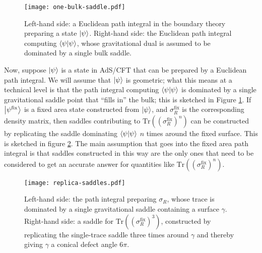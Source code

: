 \documentclass[a4paper,11pt]{article}
\renewcommand{\tr}{\text{Tr}}
\begin{document}
\begin{figure}
    \centering
    \texttt{[image: one-bulk-saddle.pdf]}
    \caption{Left-hand side: a Euclidean path integral in the boundary theory preparing a state $\ket{\psi}$. Right-hand side: the Euclidean path integral computing $\braket{\psi}{\psi}$, whose gravitational dual is assumed to be dominated by a single bulk saddle.}
    \label{fig:one-bulk-saddle}
\end{figure}

Now, suppose $\ket{\psi}$ is a state in AdS/CFT that can be prepared by a Euclidean path integral. We will assume that $\ket{\psi}$ is geometric; what this means at a technical level is that the path integral computing $\braket{\psi}{\psi}$ is dominated by a single gravitational saddle point that ``fills in'' the bulk; this is sketched in Figure \ref{fig:one-bulk-saddle}. If $\ket{\psi^{\text{fix}}}$ is a fixed area state constructed from $\ket{\psi}$, and $\sigma^{\text{fix}}_R$ is the corresponding density matrix, then saddles contributing to $\tr((\sigma^{\text{fix}}_R)^n)$ can be constructed by replicating the saddle dominating $\braket{\psi}{\psi}$ $n$ times around the fixed surface. This is sketched in figure \ref{fig:replica-saddles}. The main assumption that goes into the fixed area path integral is that saddles constructed in this way are the only ones that need to be considered to get an accurate answer for quantities like $\tr((\sigma^{\text{fix}}_R)^n).$

\begin{figure}
    \centering
    \texttt{[image: replica-saddles.pdf]}
    \caption{Left-hand side: the path integral preparing $\sigma_R$, whose trace is dominated by a single gravitational saddle containing a surface $\gamma$. Right-hand side: a saddle for $\tr((\sigma_R^{\text{fix}})^3)$, constructed by replicating the single-trace saddle three times around $\gamma$ and thereby giving $\gamma$ a conical defect angle $6 \pi$.}
    \label{fig:replica-saddles}
\end{figure}
\end{document}
